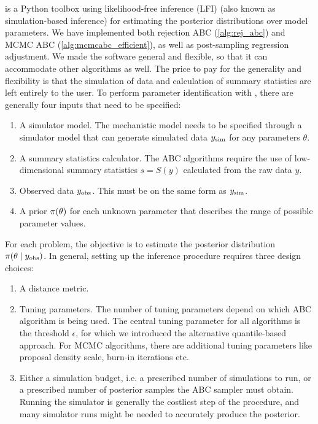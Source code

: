  is a Python toolbox using likelihood-free inference (LFI) (also known as simulation-based inference) for estimating the posterior distributions over model parameters. We have implemented both rejection ABC (\cref{alg:rej_abc}) and MCMC ABC (\cref{alg:mcmcabc_efficient}), as well as post-sampling regression adjustment. We made the software general and flexible, so that it can accommodate other algorithms as well. The price to pay for the generality and flexibility is that the simulation of data and calculation of summary statistics are left entirely to the user. To perform parameter identification with , there are generally four inputs that need to be specified:
\begin{enumerate}
    \item A simulator model. The mechanistic model needs to be specified through a simulator model that can generate simulated data $y_\mathrm{sim}$ for any parameters $\theta$. 
    \item A summary statistics calculator. The ABC algorithms require the use of low-dimensional summary statistics $s = S(y)$ calculated from the raw data $y$. 
    \item Observed data $y_\mathrm{obs}$. This must be on the same form as $y_\mathrm{sim}$.
    \item A prior $\pi \qty(\theta)$ for each unknown parameter that describes the range of possible parameter values. 
\end{enumerate}
For each problem, the objective is to estimate the posterior distribution $\pi \qty(\theta \mid y_\mathrm{obs})$. In general, setting up the inference procedure requires three design choices: 
\begin{enumerate}
    \item A distance metric.
    \item Tuning parameters. The number of tuning parameters depend on which ABC algorithm is being used. The central tuning parameter for all algorithms is the threshold $\epsilon$, for which we introduced the alternative quantile-based approach. For MCMC algorithms, there are additional tuning parameters like proposal density scale, burn-in iterations etc. 
    \item Either a simulation budget, i.e. a prescribed number of simulations to run, or a prescribed number of posterior samples the ABC sampler must obtain. Running the simulator is generally the costliest step of the procedure, and many simulator runs might be needed to accurately produce the posterior.
\end{enumerate}

